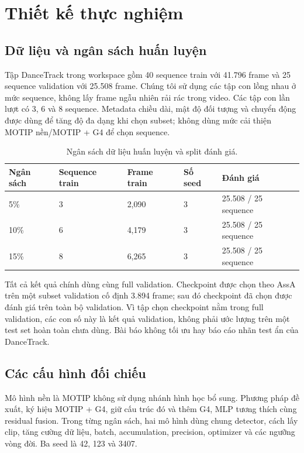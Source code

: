 \FloatBarrier
\section{Thiết kế thực nghiệm}
\FloatBarrier
\subsection{Dữ liệu và ngân sách huấn luyện}
Tập DanceTrack trong workspace gồm 40 sequence train với 41.796 frame và 25 sequence validation với 25.508 frame. Chúng tôi sử dụng các tập con lồng nhau ở mức sequence, không lấy frame ngẫu nhiên rải rác trong video. Các tập con lần lượt có 3, 6 và 8 sequence. Metadata chiều dài, mật độ đối tượng và chuyển động được dùng để tăng độ đa dạng khi chọn subset; không dùng mức cải thiện MOTIP nền/MOTIP + G4 để chọn sequence.

\begin{table}[!htbp]
\centering
\caption{Ngân sách dữ liệu huấn luyện và split đánh giá.}\label{tab:2}

\small\setlength{\tabcolsep}{4.2pt}
\begin{tabular}{lllll}
\toprule
\textbf{Ngân sách} & \textbf{Sequence train} & \textbf{Frame train} & \textbf{Số seed} & \textbf{Đánh giá} \\
\midrule
5\% & 3 & 2,090 & 3 & 25.508 / 25 sequence \\
10\% & 6 & 4,179 & 3 & 25.508 / 25 sequence \\
15\% & 8 & 6,265 & 3 & 25.508 / 25 sequence \\
\bottomrule
\end{tabular}
\end{table}

Tất cả kết quả chính dùng cùng full validation. Checkpoint được chọn theo AssA trên một subset validation cố định 3.894 frame; sau đó checkpoint đã chọn được đánh giá trên toàn bộ validation. Vì tập chọn checkpoint nằm trong full validation, các con số này là kết quả validation, không phải ước lượng trên một test set hoàn toàn chưa dùng. Bài báo không tối ưu hay báo cáo nhãn test ẩn của DanceTrack.

\FloatBarrier
\subsection{Các cấu hình đối chiếu}
Mô hình nền là MOTIP không sử dụng nhánh hình học bổ sung. Phương pháp đề xuất, ký hiệu MOTIP + G4, giữ cấu trúc đó và thêm G4, MLP tương thích cùng residual fusion. Trong từng ngân sách, hai mô hình dùng chung detector, cách lấy clip, tăng cường dữ liệu, batch, accumulation, precision, optimizer và các ngưỡng vòng đời. Ba seed là 42, 123 và 3407.

